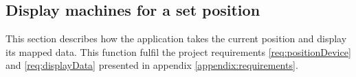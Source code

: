 \subsection{Display machines for a set position}\label{sec:implAppFuncMachines}
This section describes how the application takes the current position and display its mapped data.
This function fulfil the project requirements \ref{req:positionDevice} and \ref{req:displayData} presented in appendix \ref{appendix:requirements}.

\bigskip


